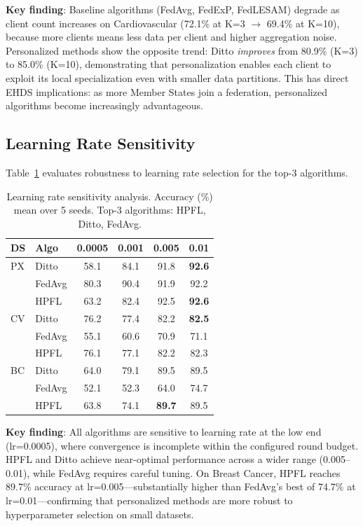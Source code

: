 \documentclass[conference,a4paper]{IEEEtran}
\begin{document}
\textbf{Key finding}: Baseline algorithms (FedAvg, FedExP, FedLESAM) degrade as client count increases on Cardiovascular (72.1\% at K=3 $\to$ 69.4\% at K=10), because more clients means less data per client and higher aggregation noise. Personalized methods show the opposite trend: Ditto \textit{improves} from 80.9\% (K=3) to 85.0\% (K=10), demonstrating that personalization enables each client to exploit its local specialization even with smaller data partitions. This has direct EHDS implications: as more Member States join a federation, personalized algorithms become increasingly advantageous.

\subsection{Learning Rate Sensitivity}

Table~\ref{tab:lr_sensitivity} evaluates robustness to learning rate selection for the top-3 algorithms.

\begin{table}[t]
\centering
\caption{Learning rate sensitivity analysis. Accuracy (\%) mean over 5 seeds. Top-3 algorithms: HPFL, Ditto, FedAvg.}
\label{tab:lr_sensitivity}
\small
\begin{tabular}{llcccc}
\toprule
\textbf{DS} & \textbf{Algo} & \textbf{0.0005} & \textbf{0.001} & \textbf{0.005} & \textbf{0.01} \\
\midrule
PX & Ditto & 58.1 & 84.1 & 91.8 & \textbf{92.6} \\
 & FedAvg & 80.3 & 90.4 & 91.9 & 92.2 \\
 & HPFL & 63.2 & 82.4 & 92.5 & \textbf{92.6} \\
\midrule
CV & Ditto & 76.2 & 77.4 & 82.2 & \textbf{82.5} \\
 & FedAvg & 55.1 & 60.6 & 70.9 & 71.1 \\
 & HPFL & 76.1 & 77.1 & 82.2 & 82.3 \\
\midrule
BC & Ditto & 64.0 & 79.1 & 89.5 & 89.5 \\
 & FedAvg & 52.1 & 52.3 & 64.0 & 74.7 \\
 & HPFL & 63.8 & 74.1 & \textbf{89.7} & 89.5 \\
\bottomrule
\end{tabular}
\end{table}

\textbf{Key finding}: All algorithms are sensitive to learning rate at the low end (lr=0.0005), where convergence is incomplete within the configured round budget. HPFL and Ditto achieve near-optimal performance across a wider range (0.005--0.01), while FedAvg requires careful tuning. On Breast Cancer, HPFL reaches 89.7\% accuracy at lr=0.005---substantially higher than FedAvg's best of 74.7\% at lr=0.01---confirming that personalized methods are more robust to hyperparameter selection on small datasets.
\end{document}
